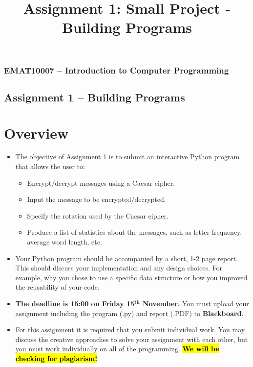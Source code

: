 \documentclass[11pt]{report}
\begin{document}
\title{Assignment 1: Small Project - Building Programs}
\subsubsection*{EMAT10007 -- Introduction to Computer Programming}
\subsection*{\Large Assignment 1 -- Building Programs}

\section*{Overview}
\begin{itemize}
	\item The objective of Assignment 1 is to submit an interactive Python program that allows the user to:
	\begin{itemize}
		\item Encrypt/decrypt messages using a Caesar cipher.
		\item Input the message to be encrypted/decrypted.
		\item Specify the rotation used by the Caesar cipher.
		\item Produce a list of statistics about the messages, such as letter frequency, average word length, etc.
	\end{itemize}
	\item Your Python program should be accompanied by a short, 1-2 page report. This should discuss your implementation and any design choices. For example, why you chose to use a specific data structure or how you improved the reusability of your code. 
 	\item \textbf{The \textbf{deadline is 15:00 on Friday 15$^{\textbf{th}}$ November.}} You must upload your assignment including the program (.py) and report (.PDF) to \textbf{Blackboard}.
	\item For this assignment it is required that you submit individual work. You may discuss the creative approaches to solve your assignment with each other, but you must work individually on all of the programming.
	\textbf{\hl{We will be checking for plagiarism!}}
\end{itemize}
\end{document}
